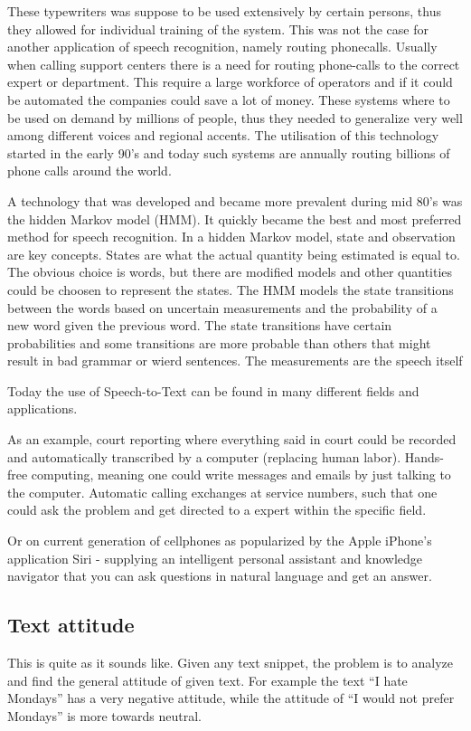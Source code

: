 \documentclass[a4paper,12pt,twoside]{ltxdoc}
\begin{document}
These typewriters was suppose to be used extensively by certain persons, thus they allowed for individual training of the system. This was not the case for another application of speech recognition, namely routing phonecalls. Usually when calling support centers there is a need for routing phone-calls to the correct expert or department. This require a large workforce of operators and if it could be automated the companies could save a lot of money. These systems where to be used on demand by millions of people, thus they needed to generalize very well among different voices and regional accents. The utilisation of this technology started in the early 90's and today such systems are annually routing billions of phone calls around the world. 

A technology that was developed and became more prevalent during mid 80's was the hidden Markov model (HMM). It quickly became the best and most preferred method for speech recognition. In a hidden Markov model, state and observation are key concepts. States are what the actual quantity being estimated is equal to. The obvious choice is words, but there are modified models and other quantities could be choosen to represent the states. The HMM models the state transitions between the words based on uncertain measurements and the probability of a new word given the previous word. The state transitions have certain probabilities and some transitions are more probable than others that might result in bad grammar or wierd sentences.  The measurements are the speech itself 

Today the use of Speech-to-Text can be found in many different fields and applications.

As an example, court reporting where everything said in court could be recorded and automatically transcribed by a computer (replacing human labor).
Hands-free computing, meaning one could write messages and emails by just talking to the computer.
Automatic calling exchanges at service numbers, such that one could ask the problem and get directed to a expert within the specific field.

Or on current generation of cellphones as popularized by the Apple iPhone's application Siri
- supplying an intelligent personal assistant and knowledge navigator that you can ask questions in natural language and get an answer. 


\subsection{Text attitude}
This is quite as it sounds like. Given any text snippet,
the problem is to analyze and find the general attitude of given text.
For example the text ``I hate Mondays'' has a very negative attitude,
while the attitude of ``I would not prefer Mondays'' is more towards neutral.
\end{document}
